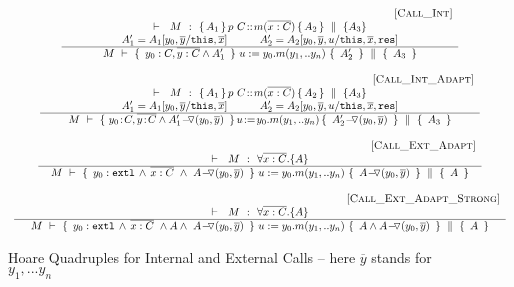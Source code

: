 \begin{figure}[htb]
{\small{
$\begin{array}{c}
 \inferruleSD{\hspace{4.7cm} [\sc{Call\_Int}]}
	{
	   	\begin{array}{c}
		\promises  M {\mprepostN{A_1}{p\ C}{m}{x}{C}{A_2} {A_3}}  \\
		{A_1' = A_1[y_0,\overline y/\prg{this}, \overline x]  \ \ \ \ \ \ \ \ \  A_2' = A_2[y_0,\overline y,u/\prg{this}, \overline x,\prg{res}]}  
		          	\end{array}
		}
	{  \hprovesN {M} 
						{ \  y_0:C,\overline {y:C} \wedge  {A_1'}\ }  
						 { \ u:=y_0.m(y_1,.. y_n)\    }
					         { \ {A_2'} \ } 
						{  \ A_3 \ }  
}
 \\
  \\
{ \inferruleSD{\hspace{4.7cm} [\sc{Call\_Int\_Adapt}]}
	{
	   	\begin{array}{c}
		\promises  M {\mprepostN{A_1}{p\ C}{m}{x}{C}{A_2} {A_3}}   \\
				{A_1' = A_1[y_0,\overline y/\prg{this}, \overline x]  \ \ \ \ \ \ \ \ \  A_2' = A_2[y_0,\overline y,u/\prg{this}, \overline x,\prg{res}] }  

          	\end{array}
		}
	{  \hprovesN {M} 
						{ \,  y_0\!:\!C, \overline {y\!:\!C} \wedge {\PushASLong {{(y_0,\overline {y})}} {A_1'}}\ }
												{ \, u\!:=\!y_0.m(y_1,.. y_n)\,    }
						{ \  { \PushASLong  {{(y_0,\overline {y})}} {A_2'}  } \ }  
						{  \  A_3\  }  
}
}
\\
 \\ 
 \inferruleSD{\hspace{4.7cm} [\sc{Call\_Ext}\_Adapt]}
 	{ 
	 \promises M   {\TwoStatesN {\overline {x:C}} {A}} 
        }
	{   \hprovesN{M} 
						{ \    { \external{y_0}} \,     \wedge \,  \overline{x:C}\  \wedge\ {\PushASLong {{(y_0,\overline {y})}}  {A}}  \ } 
						{ \ u:=y_0.m(y_1,.. y_n)\    }
						{ \   {\PushASLong {{(y_0,\overline {y})}}  A}  \ }
						{\  A \   }
	}	
\\
 \\ 
{
 \inferruleSD{\hspace{4.7cm} [\sc{Call\_Ext}\_Adapt\_Strong]}
 	{ 
	 \promises M   {\TwoStatesN {\overline {x:C}} {A}} 
        }
	{   \hprovesN{M} 
						{ \    { \external{y_0}} \,     \wedge \,  \overline{x:C}\ \wedge  A   \wedge\ {\PushASLong {{(y_0,\overline {y})}}  {A} }\  }   
						{ \ u:=y_0.m(y_1,.. y_n)\    }
						{ \   A \wedge {\PushASLong {{(y_0,\overline {y})}}  {A} } \  }  
						{\  A \   }	
}
}

\end{array}
$
}}
\caption{Hoare Quadruples for Internal and External Calls -- here $\overline y$ stands for $y_1, ... y_n$}
\label{f:internal:calls}
\label{f:external:calls}
\label{f:calls}
\end{figure}

